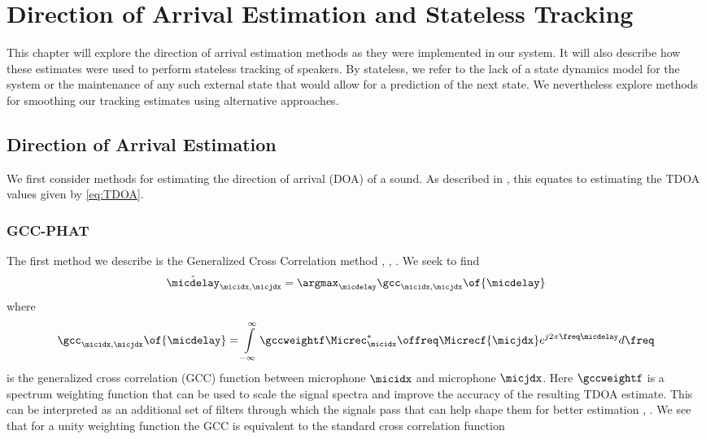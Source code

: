 \documentclass{uiucecethesis09}
\begin{document}
\chapter{Direction of Arrival Estimation and Stateless Tracking}
  
  This chapter will explore the direction of arrival estimation methods as they 
  were implemented in our system. It will also describe how these estimates were 
  used to perform stateless tracking of speakers. By stateless, we refer to the 
  lack of a state dynamics model for the system or the maintenance of any such 
  external state that would allow for a prediction of the next state. We 
  nevertheless explore methods for smoothing our tracking estimates using 
  alternative approaches.

  \section{Direction of Arrival Estimation}
    We first consider methods for estimating the direction of arrival (DOA) of a 
    sound. As described in , this equates to estimating the 
    TDOA values given by \eqref{eq:TDOA}.
    \subsection{GCC-PHAT}
      The first method we describe is the Generalized Cross Correlation method 
      \cite{knapp1976generalized}, \cite{brandstein1997robust}, 
      \cite{benesty2010microphone}.
      We seek to find
      \begin{equation} \label{eq:gcc_estimate}
        \hat{\micdelay}_{\micidx, \micjdx} = \argmax_{\micdelay}{\gcc_{\micidx, 
        \micjdx}\of{\micdelay}} \end{equation}
      where
      \begin{align} \label{eq:gcc_dfn}
        \gcc_{\micidx,\micjdx}\of{\micdelay} &= 
        \int\limits_{-\infty}^{\infty}{\gccweightf\Micrec_\micidx^*\offreq\Micrecf{\micjdx} 
        e^{j2\pi\freq\micdelay}} d\freq\\
      \end{align}
      is the generalized cross correlation (GCC) function between microphone 
      $\micidx$ and microphone $\micjdx$. Here $\gccweightf$ is a spectrum 
      weighting function that can be used to scale the signal spectra and 
      improve the accuracy of the resulting TDOA estimate. This can be 
      interpreted as an additional set of filters through which the signals pass 
      that can help shape them for better estimation 
      \cite{brandstein1997robust}, \cite{knapp1976generalized}.  We see that for 
      a unity weighting function the GCC is equivalent to the standard cross 
      correlation function
\end{document}
